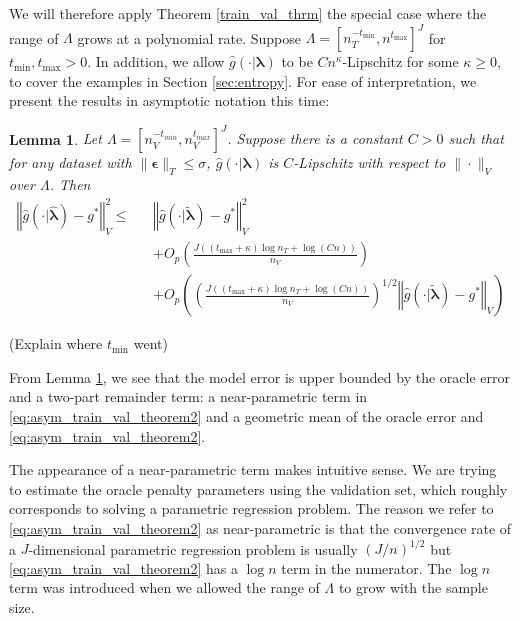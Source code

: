 \documentclass[12pt]{article}
\newtheorem{lemma}{Lemma}
\begin{document}
We will therefore apply Theorem \ref{train_val_thrm} the special case where the range of $\Lambda$ grows at a polynomial rate. Suppose $\Lambda = [n_T^{-t_{\min}},n^{t_{\max}}]^{J}$ for $t_{\min}, t_{\max} > 0$. In addition, we allow $\hat g(\cdot | \boldsymbol{\lambda})$ to be  $Cn^\kappa$-Lipschitz for some $\kappa \ge 0$, to cover the examples in Section \ref{sec:entropy}. For ease of interpretation, we present the results in asymptotic notation this time:

\begin{lemma}
	\label{lemma:train_val_special}
	Let $\Lambda=[n_{V}^{-t_{min}},n_{V}^{t_{max}}]^{J}$. Suppose there is a constant $C>0$ such that for any dataset with $\|\boldsymbol{\epsilon}\|_T \le \sigma$, $\hat g (\cdot |\boldsymbol{\lambda} )$ is $C$-Lipschitz with respect to $\| \cdot \|_V$ over $\Lambda$.
	Then
	\begin{eqnarray}
	\left\Vert \hat{g}(\cdot|\hat{\boldsymbol{\lambda}})-g^{*}\right\Vert _{V}^2 \le 
	&& \left\Vert \hat{g}(\cdot|\tilde{\boldsymbol{\lambda}})-g^{*}\right\Vert^2_{V} \label{eq:asym_train_val_theorem1} \\
	&& + O_p \left(\frac{J\left (\left(t_{\max}+\kappa\right)\log n_T + \log (Cn) \right )}{n_{V}}\right) \label{eq:asym_train_val_theorem2} \\
	&& + O_p \left(
	\left (
	\frac{J\left (\left(t_{\max}+\kappa\right)\log n_T + \log (Cn) \right )}{n_{V}}
	\right )^{1/2}
	 \left\Vert \hat{g}(\cdot|\tilde{\boldsymbol{\lambda}})-g^{*}\right\Vert _{V}
	 \right )
	  \label{eq:asym_train_val_theorem3}
	\end{eqnarray}
\end{lemma}
(Explain where $t_{\min}$ went)

From Lemma \ref{lemma:train_val_special}, we see that the model error is upper bounded by the oracle error and a two-part remainder term: a near-parametric term in \ref{eq:asym_train_val_theorem2} and a geometric mean of the oracle error and \ref{eq:asym_train_val_theorem2}.

The appearance of a near-parametric term makes intuitive sense. We are trying to estimate the oracle penalty parameters using the validation set, which roughly corresponds to solving a parametric regression problem. The reason we refer to \ref{eq:asym_train_val_theorem2} as near-parametric is that the convergence rate of a $J$-dimensional parametric regression problem is usually $(J/n)^{1/2}$ but \ref{eq:asym_train_val_theorem2} has a $\log n$ term in the numerator. The $\log n$ term was introduced when we allowed the range of $\Lambda$ to grow with the sample size.
\end{document}
